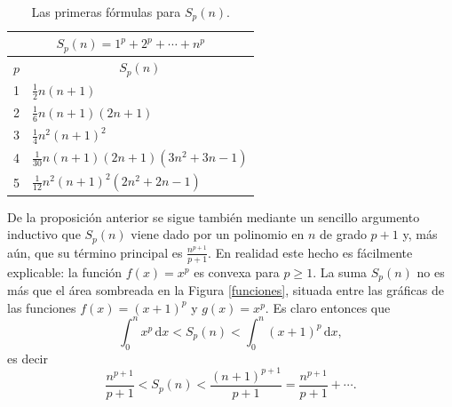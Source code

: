 \begin{table}\begin{center}
\begin{tabular}{|c|l|}
\hline
\multicolumn{2}{|c|}{\rule[-3mm]{0mm}{8mm} $S_p(n)=1^p+2^p+\cdots +n^p$}\\
\hline
$p$ & \multicolumn{1}{c|}{\rule[-2mm]{0mm}{6mm} $S_p(n)$} \\
\hline
\hline
\rule[-2mm]{0mm}{6mm} 1& $\frac{1}{2}n(n+1)$\\
\hline
\rule[-2mm]{0mm}{6mm} 2& $\frac{1}{6}n(n+1)(2n+1)$\\
\hline
\rule[-2mm]{0mm}{6mm} 3& $\frac{1}{4}n^2(n+1)^2$\\
\hline
\rule[-2mm]{0mm}{6mm} 4& $\frac{1}{30}n(n+1)(2n+1)(3n^2+3n-1)$\\
\hline
\rule[-2mm]{0mm}{6mm} 5& $\frac{1}{12}n^2(n+1)^2(2n^2+2n-1)$\\
\hline
\end{tabular}\end{center}
\caption{\label{potencias} Las primeras f\'ormulas para $S_p(n)$.}
\end{table}

De la proposici\'on anterior se sigue tambi\'en mediante un sencillo argumento inductivo que $S_p(n)$ viene dado por un polinomio en $n$ de grado $p+1$ y, m\'as a\'un, que  su t\'ermino principal es $\frac{n^{p+1}}{p+1}$. En realidad este hecho es f\'acilmente explicable: la funci\'on $f(x)=x^p$ es convexa para $p\geq 1$. La suma $S_p(n)$ no es m\'as que el \'area sombreada en la Figura \ref{funciones}, situada entre las gr\'aficas de las funciones $f(x)=(x+1)^p$ y $g(x)=x^p$. Es claro entonces que $$\int_0^nx^p\,\mathrm{d}x<S_p(n)<\int_0^n(x+1)^p\,\mathrm{d}x ,$$
es decir $$\frac{n^{p+1}}{p+1}<S_p(n)<\frac{(n+1)^{p+1}}{p+1}=\frac{n^{p+1}}{p+1}+\cdots.$$

